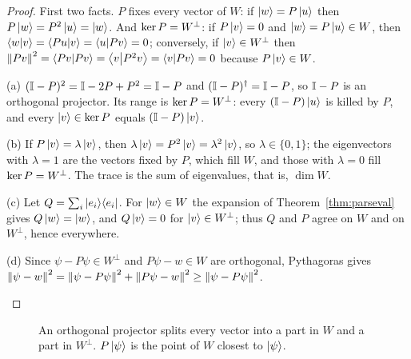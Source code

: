 \begin{proof}
  First two facts. $P$ fixes every vector of $W$: if $\left|w\right\rangle=P\left|u\right\rangle$ then $P\left|w\right\rangle=P^2\left|u\right\rangle=\left|w\right\rangle$. And $\operatorname{ker} P=W^\perp$: if $P\left|v\right\rangle=0$ and $\left|w\right\rangle=P\left|u\right\rangle\in W$, then $\left\langle w\middle|v\right\rangle=\left\langle Pu\middle|v\right\rangle=\left\langle u\middle|Pv\right\rangle=0$; conversely, if $\left|v\right\rangle\in W^\perp$ then $\left\|Pv\right\|^2=\left\langle Pv\middle|Pv\right\rangle=\left\langle v\middle|P^2v\right\rangle=\left\langle v\middle|Pv\right\rangle=0$ because $P\left|v\right\rangle\in W$.
  \begin{steps}
    \item (a) $(\mathbb{I}-P)^2=\mathbb{I}-2P+P^2=\mathbb{I}-P$ and $(\mathbb{I}-P)^\dagger=\mathbb{I}-P$, so $\mathbb{I}-P$ is an orthogonal projector. Its range is $\operatorname{ker} P=W^\perp$: every $(\mathbb{I}-P)\left|u\right\rangle$ is killed by $P$, and every $\left|v\right\rangle\in\operatorname{ker} P$ equals $(\mathbb{I}-P)\left|v\right\rangle$.
    \item (b) If $P\left|v\right\rangle=\lambda\left|v\right\rangle$, then $\lambda\left|v\right\rangle=P^2\left|v\right\rangle=\lambda^2\left|v\right\rangle$, so $\lambda\in\{0,1\}$; the eigenvectors with $\lambda=1$ are the vectors fixed by $P$, which fill $W$, and those with $\lambda=0$ fill $\operatorname{ker} P=W^\perp$. The trace is the sum of eigenvalues, that is, $\dim W$.
    \item (c) Let $Q=\sum_i\left|e_i\right\rangle\!\left\langle e_i\right|$. For $\left|w\right\rangle\in W$ the expansion of Theorem~\ref{thm:parseval} gives $Q\left|w\right\rangle=\left|w\right\rangle$, and $Q\left|v\right\rangle=0$ for $\left|v\right\rangle\in W^\perp$; thus $Q$ and $P$ agree on $W$ and on $W^\perp$, hence everywhere.
    \item (d) Since $\psi-P\psi\in W^\perp$ and $P\psi-w\in W$ are orthogonal, Pythagoras gives $\left\|\psi-w\right\|^2=\left\|\psi-P\psi\right\|^2+\left\|P\psi-w\right\|^2\ge\left\|\psi-P\psi\right\|^2$. \qedhere
  \end{steps}
\end{proof}

\begin{figure}[htb]
  \centering
  \caption{An orthogonal projector splits every vector into a part in $W$ and a part in $W^\perp$. $P\left|\psi\right\rangle$ is the point of $W$ closest to $\left|\psi\right\rangle$.}
  \label{fig:proj}
\end{figure}


